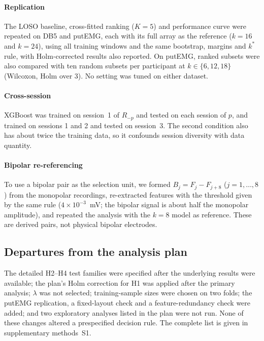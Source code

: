 \paragraph{Replication} The LOSO baseline, cross-fitted ranking ($K = 5$) and performance curve were repeated on DB5 and putEMG, each with its full array as the reference ($k = 16$ and $k = 24$), using all training windows and the same bootstrap, margins and $k^*$ rule, with Holm-corrected results also reported. On putEMG, ranked subsets were also compared with ten random subsets per participant at $k \in \{6, 12, 18\}$ (Wilcoxon, Holm over 3). No setting was tuned on either dataset.

\paragraph{Cross-session} XGBoost was trained on session~1 of $R_{-p}$ and tested on each session of $p$, and trained on sessions 1 and 2 and tested on session~3. The second condition also has about twice the training data, so it confounds session diversity with data quantity.

\paragraph{Bipolar re-referencing} To use a bipolar pair as the selection unit, we formed $B_j = F_j - F_{j+8}$ ($j = 1, \ldots, 8$) from the monopolar recordings, re-extracted features with the threshold given by the same rule ($4 \times 10^{-3}$~mV; the bipolar signal is about half the monopolar amplitude), and repeated the analysis with the $k = 8$ model as reference. These are derived pairs, not physical bipolar electrodes.

\subsection{Departures from the analysis plan}
\label{sec:deviations}
The detailed H2--H4 test families were specified after the underlying results were available; the plan's Holm correction for H1 was applied after the primary analysis; $\lambda$ was not selected; training-sample sizes were chosen on two folds; the putEMG replication, a fixed-layout check and a feature-redundancy check were added; and two exploratory analyses listed in the plan were not run. None of these changes altered a prespecified decision rule. The complete list is given in supplementary methods~S1.

